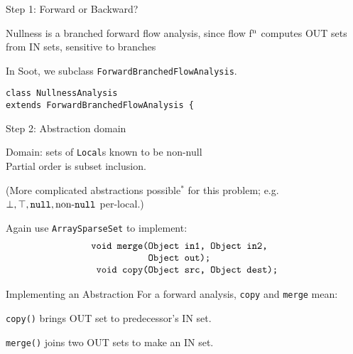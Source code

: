 \begin{slide}{Step 1: Forward or Backward?}

Nullness is a branched forward flow analysis, since flow
f$^{\mbox{\scriptsize n}}$ computes {\sf OUT} sets from {\sf IN} sets, 
sensitive to branches

\qquad

In Soot, we subclass {\tt \red ForwardBranchedFlowAnalysis}.

\qquad

{\small \red \tt class NullnessAnalysis \\ 
           \qquad extends ForwardBranchedFlowAnalysis \{ }
\end{slide}

\begin{slide}{Step 2: Abstraction domain}
\vspace*{-0.2in}

Domain: sets of {\tt Local}s known to be non-null\\
Partial order is subset inclusion.

\quad
\vspace*{-0.05in}

(More complicated abstractions possible$^{*}$ for this problem; e.g. 
$\perp, \top, \mbox{\tt null}, \mbox{non-{\tt null}}$ per-local.)

\quad
\vspace*{-0.05in}

Again use {\tt ArraySparseSet} to implement:
{\small 
\[ \mbox{\tt \begin{tabular}{r@{}l}
                 void merge(&Object in1, Object in2,\\
                            &Object out);\\
                 void copy(&Object src, Object dest);
\end{tabular}}\]
}

\end{slide}

\begin{slide}{Implementing an Abstraction}
\vspace*{-0.2in}
For a forward analysis, {\tt copy} and {\tt merge} mean:
\begin{center}

\end{center}
{\tt copy()} brings OUT set to predecessor's IN set.

\begin{center}

\end{center}
{\tt merge()} joins two OUT sets to make an IN set.
\end{slide}

